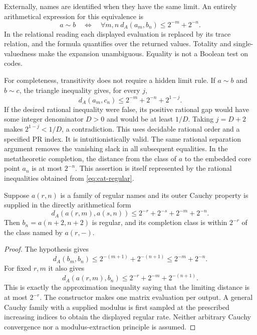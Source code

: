 Externally, names are identified when they have the same limit. An entirely
arithmetical expression for this equivalence is
\begin{equation}
 a\sim b\quad\Longleftrightarrow\quad
 \forall m,n\ d_A(a_m,b_n)\leq 2^{-m}+2^{-n}.
 \label{eq:cat-equivalence}
\end{equation}
In the relational reading each displayed evaluation is replaced by its trace
relation, and the formula quantifies over the returned values. Totality and
single-valuedness make the expansion unambiguous. Equality is not a Boolean
test on codes.

For completeness, transitivity does not require a hidden limit rule. If
$a\sim b$ and $b\sim c$, the triangle inequality gives, for every $j$,
\[
 d_A(a_m,c_n)\leq 2^{-m}+2^{-n}+2^{1-j}.
\]
If the desired rational inequality were false, its positive rational gap
would have some integer denominator $D>0$ and would be at least $1/D$.
Taking $j=D+2$ makes $2^{1-j}<1/D$, a contradiction. This uses decidable
rational order and a specified PR index. It is intuitionistically valid.
The same rational separation argument removes the vanishing slack in all
subsequent equalities. In the metatheoretic completion, the distance from
the class of $a$ to the embedded core point $a_n$ is at most $2^{-n}$.
This assertion is itself represented by the rational inequalities obtained
from \eqref{eq:cat-regular}.

\begin{lemma}
\label{lem:cat-complete}
Suppose $a(r,n)$ is a family of regular names and its outer Cauchy property
is supplied in the directly arithmetical form
\[
 d_A(a(r,m),a(s,n))
 \leq 2^{-r}+2^{-s}+2^{-m}+2^{-n}.
\]
Then $b_n=a(n+2,n+2)$ is regular, and its completion class is within
$2^{-r}$ of the class named by $a(r,-)$.
\end{lemma}
\begin{proof}
The hypothesis gives
\[
 d_A(b_m,b_n)\leq 2^{-(m+1)}+2^{-(n+1)}
 \leq2^{-m}+2^{-n}.
\]
For fixed $r,m$ it also gives
\[
 d_A(a(r,m),b_n)\leq2^{-r}+2^{-m}+2^{-(n+1)}.
\]
This is exactly the approximation inequality saying that the limiting
distance is at most $2^{-r}$. The constructor makes one matrix evaluation
per output. A general Cauchy family with a supplied modulus is first sampled
at the prescribed increasing indices to obtain the displayed regular rate.
Neither arbitrary Cauchy convergence nor a modulus-extraction principle is
assumed.
\end{proof}

